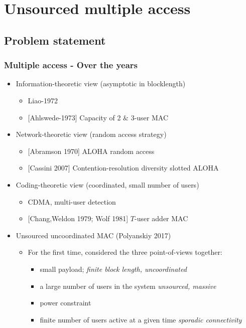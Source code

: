 \section{Unsourced multiple access}
\subsection{Problem statement}
\begin{frame} \frametitle{Multiple access - Over the years}

\begin{itemize}
\setlength{\itemsep}{3ex}
   \item Information-theoretic view (asymptotic in blocklength)
\begin{itemize}
\item  Liao-1972
\item {[Ahlswede-1973]} Capacity of 2 $\&$ 3-user MAC 
\end{itemize}

   \item Network-theoretic view (random access strategy)
	\begin{itemize}
		\item {[Abramson 1970]} ALOHA random access
		\item {[Cassini 2007]} Contention-resolution diversity slotted ALOHA
	\end{itemize}
	
	\item Coding-theoretic view (coordinated, small number of users)
		\begin{itemize}
		\item  CDMA, multi-user detection
		\item {[Chang,Weldon 1979; Wolf 1981]} $T$-user adder MAC 
	\end{itemize}
	\pause

	\item Unsourced uncoordinated MAC (Polyanskiy 2017)
		\begin{itemize}
			\item For the first time, considered the three point-of-views together: 
			\begin{itemize}
				\item small payload; \emph{finite block length, uncoordinated}
				\item a large number of users in the system \emph{unsourced, massive}
				\item power constraint 
				\item finite number of users active at a given time \emph{sporadic connectivity}
			\end{itemize}
	   \end{itemize}
\end{itemize}
\end{frame}

